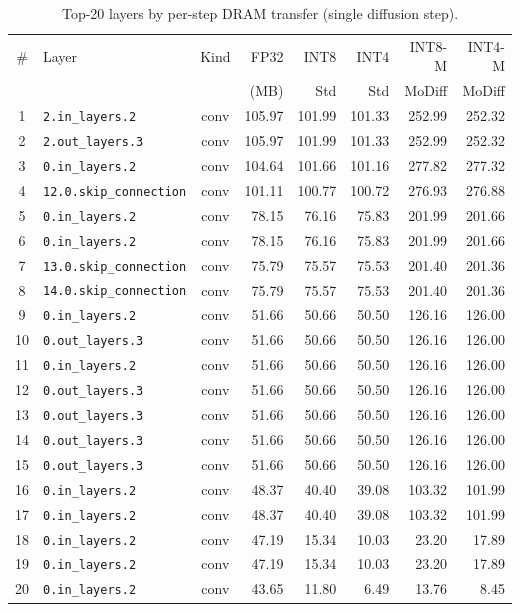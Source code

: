 \begin{table}[t]
\centering
\caption{Top-20 layers by per-step DRAM transfer (single diffusion step).}
\label{tab:memory_per_layer}
\begin{tabular}{clcrrrrr}
\toprule
\# & Layer & Kind & FP32 & INT8 & INT4 & INT8-M & INT4-M \\
 & & & (MB) & Std & Std & MoDiff & MoDiff \\
\midrule
  1 & \texttt{2.in\_layers.2} & conv & 105.97 & 101.99 & 101.33 & 252.99 & 252.32 \\
  2 & \texttt{2.out\_layers.3} & conv & 105.97 & 101.99 & 101.33 & 252.99 & 252.32 \\
  3 & \texttt{0.in\_layers.2} & conv & 104.64 & 101.66 & 101.16 & 277.82 & 277.32 \\
  4 & \texttt{12.0.skip\_connection} & conv & 101.11 & 100.77 & 100.72 & 276.93 & 276.88 \\
  5 & \texttt{0.in\_layers.2} & conv & 78.15 & 76.16 & 75.83 & 201.99 & 201.66 \\
  6 & \texttt{0.in\_layers.2} & conv & 78.15 & 76.16 & 75.83 & 201.99 & 201.66 \\
  7 & \texttt{13.0.skip\_connection} & conv & 75.79 & 75.57 & 75.53 & 201.40 & 201.36 \\
  8 & \texttt{14.0.skip\_connection} & conv & 75.79 & 75.57 & 75.53 & 201.40 & 201.36 \\
  9 & \texttt{0.in\_layers.2} & conv & 51.66 & 50.66 & 50.50 & 126.16 & 126.00 \\
  10 & \texttt{0.out\_layers.3} & conv & 51.66 & 50.66 & 50.50 & 126.16 & 126.00 \\
  11 & \texttt{0.in\_layers.2} & conv & 51.66 & 50.66 & 50.50 & 126.16 & 126.00 \\
  12 & \texttt{0.out\_layers.3} & conv & 51.66 & 50.66 & 50.50 & 126.16 & 126.00 \\
  13 & \texttt{0.out\_layers.3} & conv & 51.66 & 50.66 & 50.50 & 126.16 & 126.00 \\
  14 & \texttt{0.out\_layers.3} & conv & 51.66 & 50.66 & 50.50 & 126.16 & 126.00 \\
  15 & \texttt{0.out\_layers.3} & conv & 51.66 & 50.66 & 50.50 & 126.16 & 126.00 \\
  16 & \texttt{0.in\_layers.2} & conv & 48.37 & 40.40 & 39.08 & 103.32 & 101.99 \\
  17 & \texttt{0.in\_layers.2} & conv & 48.37 & 40.40 & 39.08 & 103.32 & 101.99 \\
  18 & \texttt{0.in\_layers.2} & conv & 47.19 & 15.34 & 10.03 & 23.20 & 17.89 \\
  19 & \texttt{0.in\_layers.2} & conv & 47.19 & 15.34 & 10.03 & 23.20 & 17.89 \\
  20 & \texttt{0.in\_layers.2} & conv & 43.65 & 11.80 & 6.49 & 13.76 & 8.45 \\
\bottomrule
\end{tabular}
\end{table}
